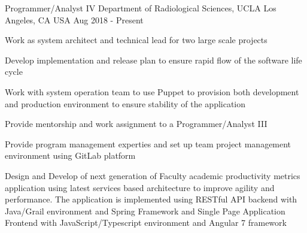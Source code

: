 


\begin{cventries}


  \cventry
    {Programmer/Analyst IV} %
    {Department of Radiological Sciences, UCLA} %
    {Los Angeles, CA USA} %
    {Aug 2018 - Present} %
    {
      \begin{cvitems} %
        \item {Work as system architect and technical lead for two large scale projects}
        \item {Develop implementation and release plan to ensure rapid flow of the software life cycle}
        \item { Work with system operation team to use Puppet to provision both development and production environment to ensure stability of the application}
        \item {Provide mentorship and work assignment  to a Programmer/Analyst III }
        \item {Provide program management experties and set up team project management environment using GitLab platform}
	       \item {Design and Develop of next generation of  Faculty academic productivity metrics application using latest services based architecture to improve agility and performance.  The application is implemented using RESTful API backend with Java/Grail environment and Spring Framework and Single Page Application Frontend with JavaScript/Typescript environment and Angular 7 framework } 
      \end{cvitems}
    }
	


\end{cventries}
